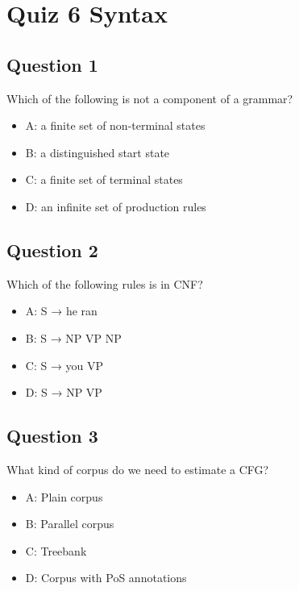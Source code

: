 \documentclass[
  11pt,
  british,
]{article}
\providecommand{\tightlist}{%
  \setlength{\itemsep}{0pt}\setlength{\parskip}{0pt}}
\begin{document}
\hypertarget{quiz-6-syntax}{%
\section{Quiz 6 Syntax}\label{quiz-6-syntax}}

\hypertarget{question-1-5}{%
\subsection{Question 1}\label{question-1-5}}

Which of the following is not a component of a grammar?

\begin{itemize}
\tightlist
\item
  A: a finite set of non-terminal states
\item
  B: a distinguished start state
\item
  C: a finite set of terminal states
\item
  D: an infinite set of production rules
\end{itemize}

\hypertarget{question-2-5}{%
\subsection{Question 2}\label{question-2-5}}

Which of the following rules is in CNF?

\begin{itemize}
\tightlist
\item
  A: S → he ran
\item
  B: S → NP VP NP
\item
  C: S → you VP
\item
  D: S → NP VP
\end{itemize}

\hypertarget{question-3-5}{%
\subsection{Question 3}\label{question-3-5}}

What kind of corpus do we need to estimate a CFG?

\begin{itemize}
\tightlist
\item
  A: Plain corpus
\item
  B: Parallel corpus
\item
  C: Treebank
\item
  D: Corpus with PoS annotations
\end{itemize}
\end{document}
